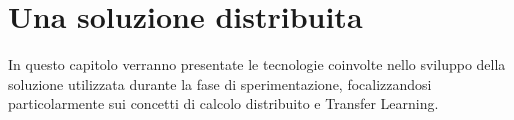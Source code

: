 \chapter{Una soluzione distribuita} \label{sol_distribuita}
In questo capitolo verranno presentate le tecnologie coinvolte nello sviluppo della soluzione utilizzata durante la fase di sperimentazione, focalizzandosi particolarmente sui concetti di calcolo distribuito e Transfer Learning.




